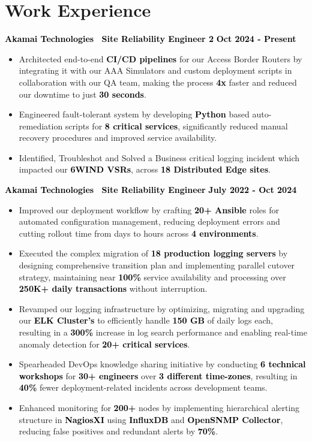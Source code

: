 \documentclass[a4paper,10pt]{article}
\newcommand{\bb}[1]{\textcolor{black}{\textbf{#1}}}
\begin{document}
\section{Work Experience}
\bb{ Akamai Technologies \textbar\ Site Reliability Engineer 2 } \hfill \bb{Oct 2024 - Present}
\smallskip
\begin{itemize}[nosep, leftmargin=2em, itemsep=3pt]
    \item Architected end-to-end \bb{CI/CD pipelines} for our Access Border Routers by integrating it with our AAA Simulators and custom deployment scripts in collaboration with our QA team, making the process \bb{4x} faster and reduced our downtime to just \bb{30 seconds}.
    \item Engineered fault-tolerant system by developing \bb{Python} based auto-remediation scripts for \bb{8 critical services}, significantly reduced manual recovery procedures and improved service availability.
    \item Identified, Troubleshot and Solved a Business critical logging incident which impacted our \bb{6WIND VSRs}, across \bb{18 Distributed Edge sites}.
\end{itemize}
\medskip
%
\bb{ Akamai Technologies \textbar\ Site Reliability Engineer } \hfill \bb{July 2022 - Oct 2024}
\smallskip
\begin{itemize}[nosep, leftmargin=2em, itemsep=3pt]
    \item Improved our deployment workflow by crafting \bb{20+ Ansible} roles for automated configuration management, reducing deployment errors and cutting rollout time from days to hours across \bb{4 environments}.
    \item Executed the complex migration of \bb{18 production logging servers} by designing comprehensive transition plan and implementing parallel cutover strategy, maintaining near \bb{100\%} service availability and processing over \bb{250K+ daily transactions} without interruption.
    \item Revamped our logging infrastructure by optimizing, migrating and upgrading our \bb{ELK Cluster's} to efficiently handle \bb{150 GB} of daily logs each, resulting in a \bb{300\%} increase in log search performance and enabling real-time anomaly detection for \bb{20+ critical services}.
    \item Spearheaded DevOps knowledge sharing initiative by conducting \bb{6 technical workshops} for \bb{30+ engineers} over \bb{3 different time-zones}, resulting in \bb{40\%} fewer deployment-related incidents across development teams.
    \item Enhanced monitoring for \bb{200+} nodes by implementing hierarchical alerting structure in \bb{NagiosXI} using \bb{InfluxDB} and \bb{OpenSNMP Collector}, reducing false positives and redundant alerts by \bb{70\%}.
\end{itemize}
\vspace{-1em}
%
%
\end{document}
